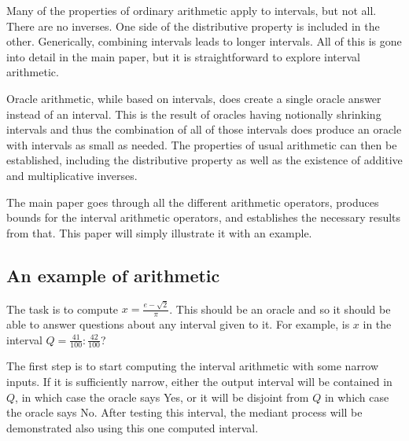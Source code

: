 \documentclass[12pt]{article}
\theoremstyle{remark}
\begin{document}
Many of the properties of ordinary arithmetic apply to intervals, but not all. There are no inverses. One side of the distributive property is included in the other. Generically, combining intervals leads to longer intervals. All of this is gone into detail in the main paper, but it is straightforward to explore interval arithmetic. 

Oracle arithmetic, while based on intervals, does create a single oracle answer instead of an interval. This is the result of oracles having notionally shrinking intervals and thus the combination of all of those intervals does produce an oracle with intervals as small as needed. The properties of usual arithmetic can then be established, including the distributive property as well as the existence of additive and multiplicative inverses.   

The main paper goes through all the different arithmetic operators, produces bounds for the interval arithmetic operators, and establishes the necessary results from that. This paper will simply illustrate it with an example. 

\subsection{An example of arithmetic}

The task is to compute $x = \frac{e-\sqrt{2}}{\pi}$. This should be an oracle and so it should be able to answer questions about any interval given to it. For example, is $x$ in the interval $Q = \frac{41}{100}: \frac{42}{100}$? 

The first step is to start computing the interval arithmetic with some narrow inputs. If it is sufficiently narrow, either the output interval will be contained in $Q$, in which case the oracle says Yes, or it will be disjoint from $Q$ in which case the oracle says No. After testing this interval, the mediant process will be demonstrated also using this one computed interval. 
\end{document}
